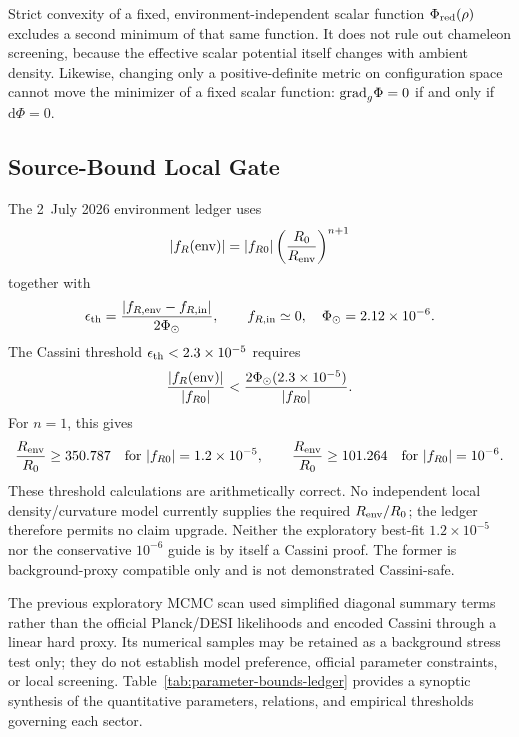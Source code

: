 \documentclass[12pt,a4paper]{article}
\theoremstyle{definition}
\theoremstyle{plain}
\theoremstyle{remark}
\newcommand{\dd}{\mathrm{d}}
\begin{document}
Strict convexity of a fixed, environment-independent scalar function
\(\Phi_{\rm red}(\rho)\) excludes a second minimum of that same function.
It does not rule out chameleon screening, because the effective scalar
potential itself changes with ambient density.  Likewise, changing only a
positive-definite metric on configuration space cannot move the minimizer of
a fixed scalar function: \({\rm grad}_g\Phi=0\) if and only if
\(\dd\Phi=0\).

\subsection{Source-Bound Local Gate}\label{sec:mcmc-results}

The 2~July 2026 environment ledger uses
\begin{equation}\label{eq:environment-contract}
 |f_R({\rm env})|
 =|f_{R0}|\left(\frac{R_0}{R_{\rm env}}\right)^{n+1}
\end{equation}
together with
\[
 \epsilon_{\rm th}
 =\frac{|f_{R,{\rm env}}-f_{R,{\rm in}}|}{2\Phi_\odot},
 \qquad f_{R,{\rm in}}\simeq0,\quad
 \Phi_\odot=2.12\times10^{-6}.
\]
The Cassini threshold \(\epsilon_{\rm th}<2.3\times10^{-5}\) requires
\begin{equation}
 \frac{|f_R({\rm env})|}{|f_{R0}|}
 <\frac{2\Phi_\odot(2.3\times10^{-5})}{|f_{R0}|}.
\end{equation}
For \(n=1\), this gives
\[
 \frac{R_{\rm env}}{R_0}\ge350.787
 \quad\text{for }|f_{R0}|=1.2\times10^{-5},
 \qquad
 \frac{R_{\rm env}}{R_0}\ge101.264
 \quad\text{for }|f_{R0}|=10^{-6}.
\]
These threshold calculations are arithmetically correct.  No independent
local density/curvature model currently supplies the required
\(R_{\rm env}/R_0\); the ledger therefore permits no claim upgrade.
Neither the exploratory best-fit \(1.2\times10^{-5}\) nor the conservative
\(10^{-6}\) guide is by itself a Cassini proof.  The former is
background-proxy compatible only and is not demonstrated Cassini-safe.

The previous exploratory MCMC scan used simplified diagonal summary terms
rather than the official Planck/DESI likelihoods and encoded Cassini through a
linear hard proxy.  Its numerical samples may be retained as a background
stress test only; they do not establish model preference, official parameter
constraints, or local screening.
Table~\ref{tab:parameter-bounds-ledger} provides a synoptic synthesis of the quantitative parameters, relations, and empirical thresholds governing each sector.
\end{document}
